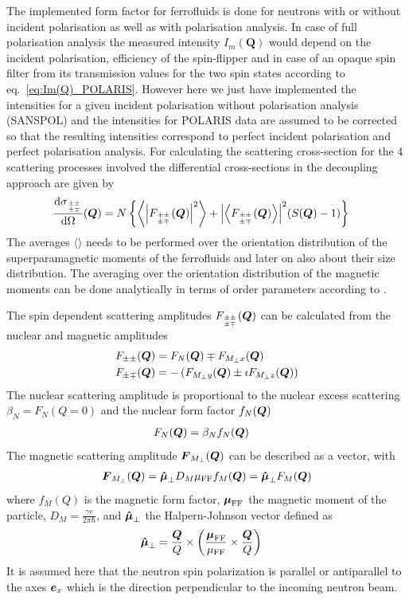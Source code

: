 The implemented form factor for ferrofluids is done for neutrons
with or without incident polarisation as well as with polarisation
analysis. In case of full polarisation analysis the measured
intensity $I_m(\mathbf{Q})$ would depend on the incident
polarisation, efficiency of the spin-flipper and in case of an
opaque spin filter from its transmission values for the two spin
states according to eq.\ \ref{eq:Im(Q)_POLARIS}. However here we
just have implemented the intensities for a given incident
polarisation without polarisation analysis (SANSPOL) and the
intensities for POLARIS data are assumed to be corrected so that the
resulting intensities correspond to perfect incident polarisation
and perfect polarisation analysis. For calculating the scattering
cross-section for the 4 scattering processes involved the
differential cross-sections in the decoupling approach are given by
\begin{align} \label{eq:dsigma_dOmega_ijSQ}
\frac{\mathrm{d}\sigma_{{\pm\pm}\atop{\pm\mp}}}{\mathrm{d}\Omega}(\BM{Q})
&= N\left\{ \left\langle
\abs{F_{{\pm\pm}\atop{\pm\mp}}(\BM{Q})}^2\right\rangle +
\abs{\left\langle F_{{\pm\pm}\atop{\pm\mp}}(\BM{Q})\right\rangle}^2
(S(\BM{Q})-1) \right\}
\end{align}
The averages $\langle\rangle$ needs to be performed over the
orientation distribution of the superparamagnetic moments of the
ferrofluids and later on also about their size distribution. The
averaging over the orientation distribution of the magnetic moments
can be done analytically in terms of order parameters according to
\cite{Wiedenmann2011,Wagner2005,Kohlbrecher1997}.

The spin dependent scattering amplitudes
$F_{{\pm\pm}\atop{\pm\mp}}(\BM{Q})$ can be calculated from the
nuclear and magnetic amplitudes
\begin{align}
F_{\pm\pm}(\BM{Q}) & = F_N(\BM{Q}) \mp F_{M_\perp x}(\BM{Q}) \\
F_{\pm\mp}(\BM{Q}) & = -\left(F_{M_\perp y}(\BM{Q}) \pm \imath
F_{M_\perp z}(\BM{Q})\right)
\end{align}
The nuclear scattering amplitude is proportional to the nuclear
excess scattering $\beta_N=F_N(Q=0)$ and the nuclear form factor
$f_N(\BM{Q})$
\begin{align}
F_N(\BM{Q}) &= \beta_N f_N(\BM{Q})
\end{align}
The magnetic scattering amplitude $\BM{F}_{M_\perp}(\BM{Q})$ can be
described as a vector, with
\begin{align}
\BM{F}_{M_\perp}(\BM{Q}) =  \BM{\hat{\mu}}_\perp D_M \mu_\text{FF}
f_M(\BM{Q})=\BM{\hat{\mu}}_\perp F_M(\BM{Q})
\end{align}
where $f_M(Q)$ is the magnetic form factor, $\BM{\mu}_\text{FF}$ the
magnetic moment of the particle, $D_M=\frac{\gamma e}{2\pi\hbar}$,
and $\BM{\hat{\mu}}_\perp$ the Halpern-Johnson vector defined as
\begin{align}
\BM{\hat{\mu}}_\perp &=
\frac{\BM{Q}}{Q}\times\left(\frac{\BM{\mu}_\text{FF}}{\mu_\text{FF}}\times\frac{\BM{Q}}{Q}\right)
\end{align}
It is assumed here that the neutron spin polarization is parallel or
antiparallel to the axes $\BM{e}_x$ which is the direction
perpendicular to the incoming neutron beam.


